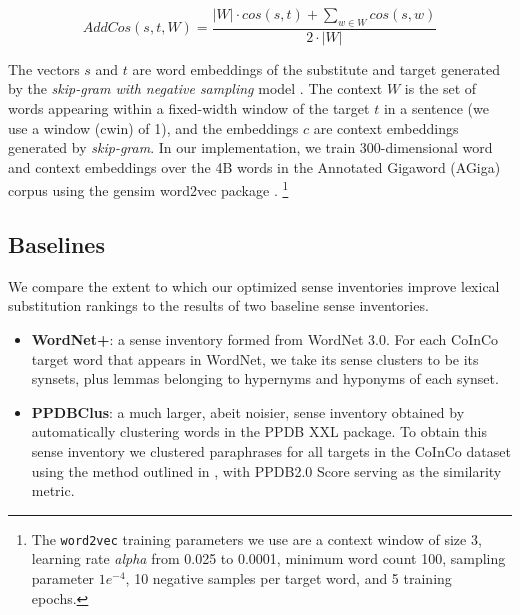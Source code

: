 \documentclass[11pt]{article}
\begin{document}
\begin{dmath}
	AddCos(s,t,W) = \frac{|W| \cdot cos(s,t) + \sum_{w \in W} cos(s,w)}{2 \cdot |W|}
\end{dmath}
	
\noindent The vectors $s$ and $t$ are word embeddings of the substitute and target generated by the \textit{skip-gram with negative sampling} model \cite{mikolov2013distributed,mikolov2013efficient}. The context $W$ is the set of words appearing within a fixed-width window of the target $t$ in a sentence (we use a window (cwin) of 1), and the embeddings $c$ are context embeddings generated by \textit{skip-gram}. In our implementation, we train 300-dimensional word and context embeddings over the 4B words in the Annotated Gigaword (AGiga) corpus \cite{napoles2012annotated} using the gensim word2vec package \cite{mikolov2013distributed,mikolov2013efficient,ismu:884893}. \footnote{The \texttt{word2vec} training parameters we use are a context window of size 3, learning rate \textit{alpha} from 0.025 to 0.0001, minimum word count 100, sampling parameter $1e^{-4}$, 10 negative samples per target word, and 5 training epochs.}

\subsection{Baselines}


We compare the extent to which our optimized sense inventories improve lexical substitution rankings to the results of two baseline sense inventories.

\begin{itemize}
\item\textbf{WordNet+}: a sense inventory formed from WordNet 3.0. For each CoInCo target word that appears in WordNet, we take its sense clusters to be its synsets, plus lemmas belonging to hypernyms and hyponyms of each synset. 
\item\textbf{PPDBClus}: a much larger, abeit noisier, sense inventory obtained by automatically clustering words in the PPDB XXL package. To obtain this sense inventory we clustered paraphrases for all targets in the CoInCo dataset using the method outlined in , with PPDB2.0 Score serving as the similarity metric.
\end{itemize}
\end{document}
